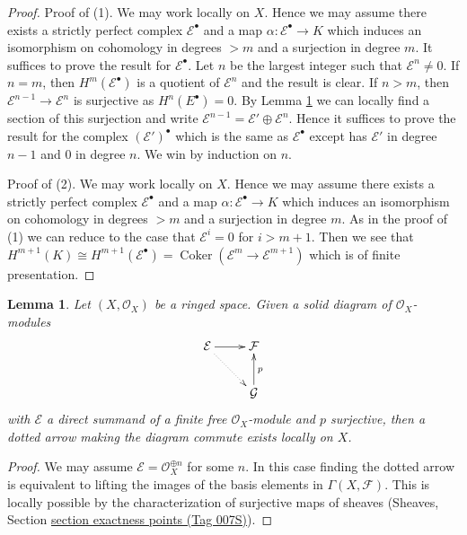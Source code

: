 \documentclass{amsart}
\theoremstyle{plain}
\newtheorem{lemma}[subsection]{Lemma}
\theoremstyle{definition}
\theoremstyle{remark}
\numberwithin{equation}{subsection}
\def\Coker{\mathop{\mathrm{Coker}}}
\begin{document}
\begin{proof}
Proof of (1). We may work locally on $X$. Hence we may assume there exists
a strictly perfect complex $\mathcal{E}^\bullet$ and a map
$\alpha : \mathcal{E}^\bullet \to K$ which induces
an isomorphism on cohomology in degrees $> m$ and a surjection in degree $m$.
It suffices to prove the result for $\mathcal{E}^\bullet$.
Let $n$ be the largest integer such that $\mathcal{E}^n \not = 0$.
If $n = m$, then $H^m(\mathcal{E}^\bullet)$ is a quotient of
$\mathcal{E}^n$ and the result is clear.
If $n > m$, then $\mathcal{E}^{n - 1} \to \mathcal{E}^n$ is surjective as
$H^n(E^\bullet) = 0$. By Lemma \ref{cohomology-lemma-local-lift-map}
we can locally find a section of this surjection and write
$\mathcal{E}^{n - 1} = \mathcal{E}' \oplus \mathcal{E}^n$.
Hence it suffices to prove the result for the complex
$(\mathcal{E}')^\bullet$ which is the same as $\mathcal{E}^\bullet$
except has $\mathcal{E}'$ in degree $n - 1$ and $0$ in degree $n$.
We win by induction on $n$.

\medskip\noindent
Proof of (2). We may work locally on $X$. Hence we may assume there exists
a strictly perfect complex $\mathcal{E}^\bullet$ and a map
$\alpha : \mathcal{E}^\bullet \to K$ which induces
an isomorphism on cohomology in degrees $> m$ and a surjection in degree $m$.
As in the proof of (1) we can reduce to the case that $\mathcal{E}^i = 0$
for $i > m + 1$. Then we see that
$H^{m + 1}(K) \cong H^{m + 1}(\mathcal{E}^\bullet) =
\Coker(\mathcal{E}^m \to \mathcal{E}^{m + 1})$
which is of finite presentation.
\end{proof}


\begin{lemma}
\label{cohomology-lemma-local-lift-map}
Let $(X, \mathcal{O}_X)$ be a ringed space.
Given a solid diagram of $\mathcal{O}_X$-modules
$$
\xymatrix{
\mathcal{E} \ar@{..>}[dr] \ar[r] & \mathcal{F} \\
& \mathcal{G} \ar[u]_p
}
$$
with $\mathcal{E}$ a direct summand of a finite free
$\mathcal{O}_X$-module and $p$ surjective, then a dotted arrow
making the diagram commute exists locally on $X$.
\end{lemma}

\begin{proof}
We may assume $\mathcal{E} = \mathcal{O}_X^{\oplus n}$ for some $n$.
In this case finding the dotted arrow is equivalent to lifting the
images of the basis elements in $\Gamma(X, \mathcal{F})$. This is
locally possible by the characterization of surjective maps of
sheaves (Sheaves, Section \href{https://stacks.math.columbia.edu/tag/007S}{section exactness points (Tag 007S)}).
\end{proof}
\end{document}
